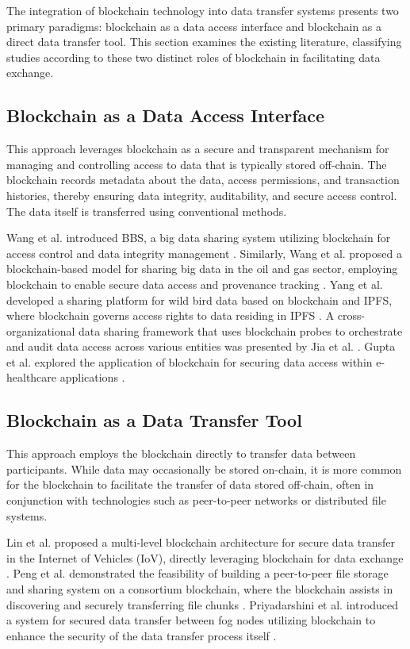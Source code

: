 \documentclass[10pt]{llncs}
\begin{document}
The integration of blockchain technology into data transfer systems presents two primary paradigms: blockchain as a data access interface and blockchain as a direct data transfer tool.
This section examines the existing literature, classifying studies according to these two distinct roles of blockchain in facilitating data exchange.

\subsection{Blockchain as a Data Access Interface}

This approach leverages blockchain as a secure and transparent mechanism for managing and controlling access to data that is typically stored off-chain.
The blockchain records metadata about the data, access permissions, and transaction histories, thereby ensuring data integrity, auditability, and secure access control.
The data itself is transferred using conventional methods.

Wang et al. introduced BBS, a big data sharing system utilizing blockchain for access control and data integrity management \cite{Wang2024}.
Similarly, Wang et al. proposed a blockchain-based model for sharing big data in the oil and gas sector, employing blockchain to enable secure data access and provenance tracking \cite{WangYY2021}.
Yang et al. developed a sharing platform for wild bird data based on blockchain and IPFS, where blockchain governs access rights to data residing in IPFS \cite{Yang2022}.
A cross-organizational data sharing framework that uses blockchain probes to orchestrate and audit data access across various entities was presented by Jia et al. \cite{Jia2023}.
Gupta et al. explored the application of blockchain for securing data access within e-healthcare applications \cite{Gupta2022}.
\subsection{Blockchain as a Data Transfer Tool}

This approach employs the blockchain directly to transfer data between participants.
While data may occasionally be stored on-chain, it is more common for the blockchain to facilitate the transfer of data stored off-chain,
 often in conjunction with technologies such as peer-to-peer networks or distributed file systems.

Lin et al. proposed a multi-level blockchain architecture for secure data transfer in the Internet of Vehicles (IoV), 
directly leveraging blockchain for data exchange \cite{Lin2023}. 
Peng et al. demonstrated the feasibility of building a peer-to-peer file storage and sharing system on a consortium blockchain, 
where the blockchain assists in discovering and securely transferring file chunks \cite{Peng2023}. 
Priyadarshini et al. introduced a system for secured data transfer between fog nodes utilizing blockchain to enhance the security of 
the data transfer process itself \cite{Priyadarshini2021}.
\end{document}
